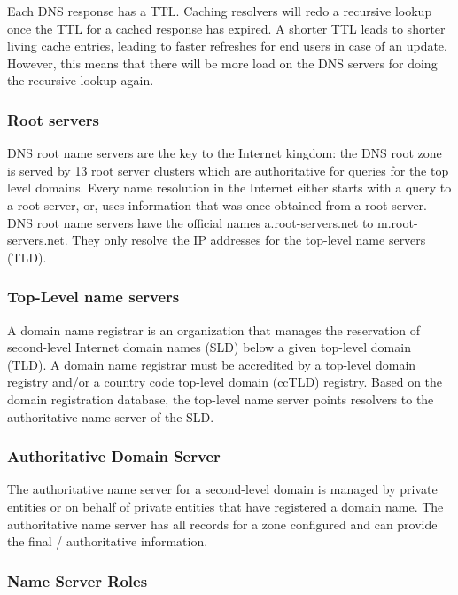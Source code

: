 \documentclass[11pt,oneside,a4paper]{article}
\begin{document}
Each DNS response has a TTL. Caching resolvers will redo a recursive lookup once the TTL for a cached response has expired. A shorter TTL leads to shorter living cache entries, leading to faster refreshes for end users in case of an update. However, this means that there will be more load on the DNS servers for doing the recursive lookup again.

\subsubsection{Root servers}

DNS root name servers are the key to the Internet kingdom: the DNS root zone is served by 13 root server clusters which are authoritative for queries for the top level domains. Every name resolution in the Internet either starts with a query to a root server, or, uses information that was once obtained from a root server. DNS root name servers have the official names a.root-servers.net to m.root-servers.net. They only resolve the IP addresses for the top-level name servers (TLD).

\subsubsection{Top-Level name servers}

A domain name registrar is an organization that manages the reservation of second-level Internet domain names (SLD) below a given top-level domain (TLD). A domain name registrar must be accredited by a top-level domain registry and/or a country code top-level domain (ccTLD) registry. Based on the domain registration database, the top-level name server points resolvers to the authoritative name server of the SLD.

\subsubsection{Authoritative Domain Server}

The authoritative name server for a second-level domain is managed by private entities or on behalf of private entities that have registered a domain name. The authoritative name server has all records for a zone configured and can provide the final / authoritative information.

\subsubsection{Name Server Roles}
\end{document}
